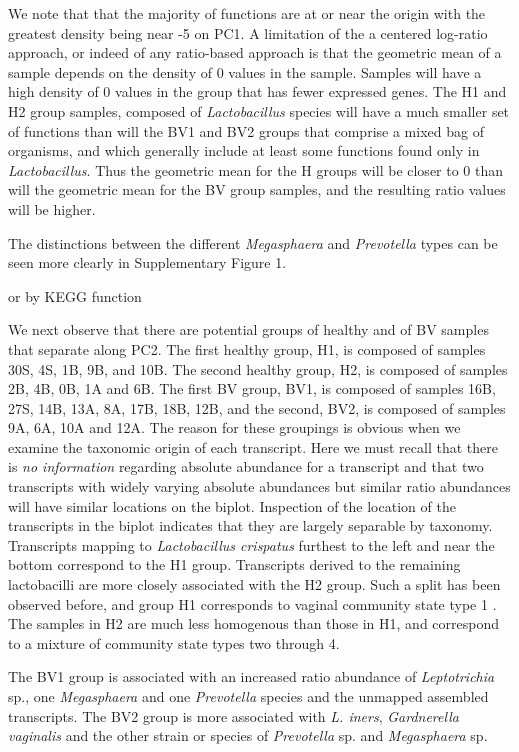\documentclass[10pt,letterpaper]{article}
\begin{document}
We note that that the majority of functions are at or near the origin with the greatest density being near -5 on PC1. A limitation of the a centered log-ratio approach, or indeed of any ratio-based approach is that the geometric mean of a sample depends on the density of 0 values in the sample.  Samples will have a high density of 0 values in the group that has fewer expressed genes. The H1 and H2 group samples, composed of \emph{Lactobacillus} species will have a much smaller set of functions than will the BV1 and BV2 groups that comprise a mixed bag of organisms, and which generally include at least some functions found only in \emph{Lactobacillus}. Thus the geometric mean for the H groups will be closer to 0 than will the geometric mean for the BV group samples, and the resulting ratio values will be higher. 


The distinctions between the different \emph{Megasphaera} and \emph{Prevotella} types can be seen more clearly in Supplementary Figure 1.


 or by KEGG function \cite{Okuda:2008} 
 
We next observe that there are potential groups of healthy and of BV samples that separate along PC2. The first healthy group, H1, is composed of samples 30S, 4S, 1B, 9B, and 10B. The second healthy group, H2, is composed of samples 2B, 4B, 0B, 1A and 6B. The first BV group, BV1, is composed of samples 16B, 27S, 14B, 13A, 8A, 17B, 18B, 12B, and the second, BV2, is composed of samples 9A, 6A, 10A and 12A. The reason for these groupings is obvious when we examine the taxonomic origin of each transcript.  Here we must recall that there is \emph{no information} regarding absolute abundance for a transcript and that two transcripts with widely varying absolute abundances but similar ratio abundances will have similar locations on the biplot. Inspection of the location of the transcripts in the biplot indicates that they are largely separable by taxonomy. Transcripts mapping to \emph{Lactobacillus crispatus}  furthest to the left and near the bottom correspond to the H1 group. Transcripts derived to the remaining lactobacilli are more closely associated with the H2 group. Such a split has been observed before, and group H1 corresponds to vaginal community state type 1 \cite{Ravel:2010}. The samples in H2 are much less homogenous than those in H1, and correspond  to a mixture of community state types two through 4. 

The BV1 group is associated with an increased ratio abundance of \emph{Leptotrichia} sp., one  \emph{Megasphaera} and one \emph{Prevotella} species and the unmapped assembled transcripts. The BV2 group is more associated with \emph{L. iners}, \emph{Gardnerella vaginalis} and the other strain or species of \emph{Prevotella} sp. and \emph{Megasphaera} sp. 
\end{document}
